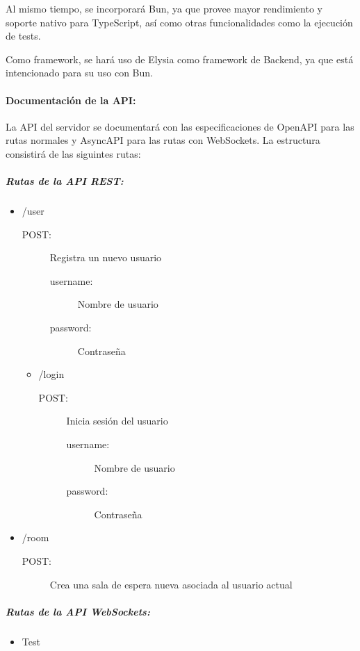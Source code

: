Al mismo tiempo, se incorporará Bun,
ya que provee mayor rendimiento y soporte nativo para TypeScript,
así como otras funcionalidades como la ejecución de tests. 

Como framework, se hará uso de Elysia como framework de Backend, ya que está intencionado para su uso con Bun. 

\paragraph{Documentación de la API:}

La API del servidor se documentará con las especificaciones de OpenAPI para las rutas normales y AsyncAPI para las rutas con WebSockets.
La estructura consistirá de las siguintes rutas:

\subparagraph{Rutas de la API REST:}

\begin{itemize}
  \item /user
    \begin{description}
      \item[POST:] Registra un nuevo usuario
        \begin{description}
          \item[username:] Nombre de usuario
          \item[password:] Contraseña
        \end{description}
    \end{description}
    \begin{itemize}
      \item /login
        \begin{description}
          \item[POST:] Inicia sesión del usuario
            \begin{description}
              \item[username:] Nombre de usuario
              \item[password:] Contraseña
            \end{description}
        \end{description}
    \end{itemize}
  \item /room
      \begin{description}
      \item[POST:] Crea una sala de espera nueva asociada al usuario actual
      \end{description}
\end{itemize}
\subparagraph{Rutas de la API WebSockets:}
\begin{itemize}
  \item Test
\end{itemize}

